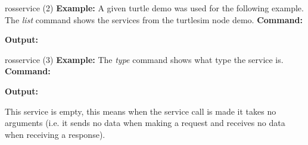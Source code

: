 \documentclass{beamer}
\begin{document}
\begin{frame}{rosservice (2)}
	\textbf{Example:} A given turtle demo was used for the following example.
	\newline
	The \textit{list} command shows the services from the turtlesim node demo.
	\textbf{Command:} 
	
	
	\textbf{Output:}
	
\end{frame}
\begin{frame}{rosservice (3)}
	\textbf{Example:} The \textit{type} command shows what type the service is.
	\newline
	\newline
	\textbf{Command:} 
	
	\textbf{Output:}
	
	This service is empty, this means when the service call is made it takes no arguments (i.e. it sends no data when making a request and receives no data when receiving a response).
\end{frame}
\end{document}
